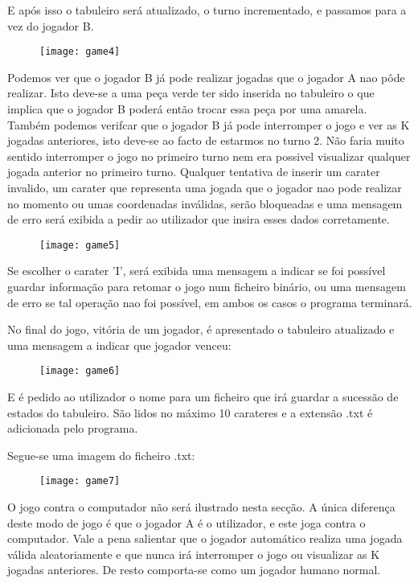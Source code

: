 \documentclass[14pt]{extarticle}
\begin{document}
E após isso o tabuleiro será atualizado, o turno incrementado, e passamos para a vez do jogador B.
\begin{figure}[h]
    \centering
    \texttt{[image: game4]}
\end{figure}

Podemos ver que o jogador B já pode realizar jogadas que o jogador A nao pôde realizar. Isto deve-se a uma peça verde ter sido inserida no tabuleiro o que implica que o jogador B poderá então trocar essa peça por uma amarela. Também podemos verifcar que o jogador B já pode interromper o jogo e ver as K jogadas anteriores, isto deve-se ao facto de estarmos no turno 2. Não faria muito sentido interromper o jogo no primeiro turno nem era possivel visualizar qualquer jogada anterior no primeiro turno.
\newpage
Qualquer tentativa de inserir um carater invalido, um carater que representa uma jogada que o jogador nao pode realizar no momento ou umas coordenadas inválidas, serão bloqueadas e uma mensagem de erro será exibida a pedir ao utilizador que insira esses dados corretamente.
\begin{figure}[h]
    \centering
    \texttt{[image: game5]}
\end{figure}

Se escolher o carater 'I', será exibida uma mensagem a indicar se foi possível guardar informação para retomar o jogo num ficheiro binário, ou uma mensagem de erro se tal operação nao foi possível, em ambos os casos o programa terminará.

No final do jogo, vitória de um jogador, é apresentado o tabuleiro atualizado e uma mensagem a indicar que jogador venceu:
\begin{figure}[h]
    \centering
    \texttt{[image: game6]}
\end{figure}

E é pedido ao utilizador o nome para um ficheiro que irá guardar a sucessão de estados do tabuleiro. São lidos no máximo 10 carateres e a extensão .txt é adicionada pelo programa.

\newpage
Segue-se uma imagem do ficheiro .txt:
\begin{figure}[h]
    \centering
    \texttt{[image: game7]}
\end{figure}

O jogo contra o computador não será ilustrado nesta secção. A única diferença deste modo de jogo é que o jogador A é o utilizador, e este joga contra o computador. Vale a pena salientar que o jogador automático realiza uma jogada válida aleatoriamente e que nunca irá interromper o jogo ou visualizar as K jogadas anteriores. De resto comporta-se como um jogador humano normal.
\end{document}
